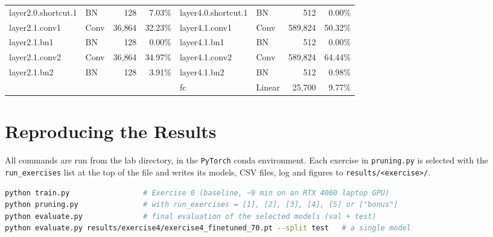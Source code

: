 \documentclass[11pt,a4paper]{article}
\newcommand{\code}[1]{\texttt{#1}}
\begin{document}
\begin{table}[H]
{\begin{tabular}{llrr@{\hskip 2.5em}llrr}
layer2.0.shortcut.1 & BN & 128 & 7.03\% & layer4.0.shortcut.1 & BN & 512 & 0.00\% \\
layer2.1.conv1 & Conv & 36{,}864 & 32.23\% & layer4.1.conv1 & Conv & 589{,}824 & 50.32\% \\
layer2.1.bn1 & BN & 128 & 0.00\% & layer4.1.bn1 & BN & 512 & 0.00\% \\
layer2.1.conv2 & Conv & 36{,}864 & 34.97\% & layer4.1.conv2 & Conv & 589{,}824 & 64.44\% \\
layer2.1.bn2 & BN & 128 & 3.91\% & layer4.1.bn2 & BN & 512 & 0.98\% \\
 & & & & fc & Linear & 25{,}700 & 9.77\% \\
\bottomrule
\end{tabular}}
\end{table}

\section{Reproducing the Results}
All commands are run from the lab directory, in the \code{PyTorch} conda environment. Each exercise in \code{pruning.py} is selected with the \code{run\_exercises} list at the top of the file and writes its models, CSV files, log and figures to \code{results/<exercise>/}.

\begin{lstlisting}[language=bash]
python train.py                 # Exercise 0 (baseline, ~9 min on an RTX 4060 laptop GPU)
python pruning.py               # with run_exercises = [1], [2], [3], [4], [5] or ["bonus"]
python evaluate.py              # final evaluation of the selected models (val + test)
python evaluate.py results/exercise4/exercise4_finetuned_70.pt --split test   # a single model
\end{lstlisting}
\end{document}
